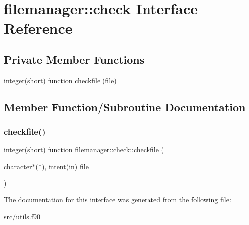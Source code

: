 \hypertarget{interfacefilemanager_1_1check}{}\section{filemanager\+:\+:check Interface Reference}
\label{interfacefilemanager_1_1check}
\subsection*{Private Member Functions}
\begin{DoxyCompactItemize}
\item 
integer(short) function \hyperlink{interfacefilemanager_1_1check_a3e31b7fed9f846da1c5ce4f52823ee88}{checkfile} (file)
\end{DoxyCompactItemize}


\subsection{Member Function/\+Subroutine Documentation}
\mbox{\label{interfacefilemanager_1_1check_a3e31b7fed9f846da1c5ce4f52823ee88}} 
\subsubsection{\texorpdfstring{checkfile()}{checkfile()}}
{\footnotesize\ttfamily integer(short) function filemanager\+::check\+::checkfile (\begin{DoxyParamCaption}\item[{character$\ast$($\ast$), intent(in)}]{file }\end{DoxyParamCaption})\hspace{0.3cm}{\ttfamily [private]}}



The documentation for this interface was generated from the following file\+:\begin{DoxyCompactItemize}
\item 
src/\hyperlink{utils_8f90}{utils.\+f90}\end{DoxyCompactItemize}

